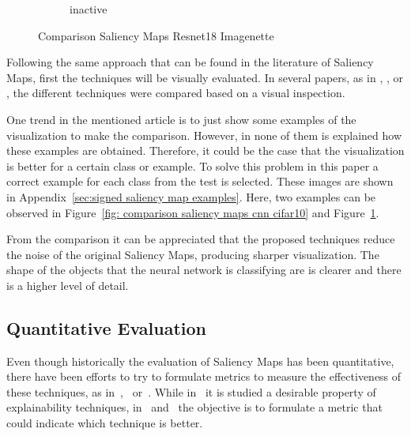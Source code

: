 \documentclass[preprint,12pt]{elsarticle}
\begin{document}
\begin{figure}
\begin{subfigure}{0.14\textwidth}
        \caption{inactive}
    \end{subfigure}
    \caption{Comparison Saliency Maps Resnet18 Imagenette}
    \label{fig: comparison saliency maps resnet18 imagenette}
\end{figure}

Following the same approach that can be found in the literature of Saliency Maps, first the techniques will be visually evaluated. In several papers, as in \cite{simonyanDeepConvolutionalNetworks2014a}, \cite{springenbergStrivingSimplicityAll2015}, \cite{smilkovSmoothGradRemovingNoise} or \cite{sundararajanAxiomaticAttributionDeep2017}, the different techniques were compared based on a visual inspection. 

One trend in the mentioned article is to just show some examples of the visualization to make the comparison. However, in none of them is explained how these examples are obtained. Therefore, it could be the case that the visualization is better for a certain class or example. To solve this problem in this paper a correct example for each class from the test is selected. These images are shown in Appendix~\ref{sec:signed saliency map examples}. Here, two examples can be observed in Figure~\ref{fig: comparison saliency maps cnn cifar10} and Figure~\ref{fig: comparison saliency maps resnet18 imagenette}.

From the comparison it can be appreciated that the proposed techniques reduce the noise of the original Saliency Maps, producing sharper visualization. The shape of the objects that the neural network is classifying are is clearer and there is a higher level of detail.

\subsection{Quantitative Evaluation}

Even though historically the evaluation of Saliency Maps has been quantitative, there have been efforts to try to formulate metrics to measure the effectiveness of these techniques, as in~\cite{petsiukRISERandomizedInput},~\cite{hookerBenchmarkInterpretabilityMethods2019} or~\cite{anconaBetterUnderstandingGradientbased2018}. While in~\cite{anconaBetterUnderstandingGradientbased2018} it is studied a desirable property of explainability techniques, in~\cite{petsiukRISERandomizedInput} and~\cite{hookerBenchmarkInterpretabilityMethods2019} the objective is to formulate a metric that could indicate which technique is better. 
\end{document}
